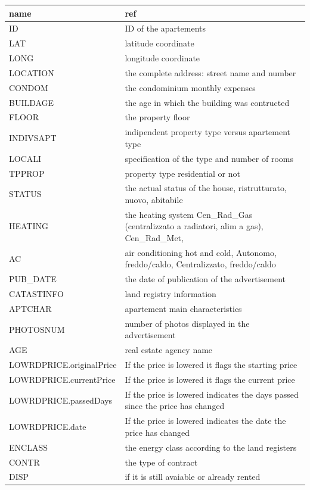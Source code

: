 \documentclass[
  12pt,
  a4paper,
  oneside]{book}
\theoremstyle{definition}
\theoremstyle{definition}
\theoremstyle{definition}
\theoremstyle{remark}
\begin{document}
\begin{longtable}{ll}
\toprule
name & ref\\
\midrule
ID & ID of the apartements\\
LAT & latitude coordinate\\
LONG & longitude coordinate\\
LOCATION & the complete address: street name and number\\
CONDOM & the condominium monthly expenses\\
\addlinespace
BUILDAGE & the age in which the building was contructed\\
FLOOR & the property floor\\
INDIVSAPT & indipendent property type versus apartement type\\
LOCALI & specification of the type and number of rooms\\
TPPROP & property type residential or not\\
\addlinespace
STATUS & the actual status of the house, ristrutturato, nuovo, abitabile\\
HEATING & the heating system Cen\_Rad\_Gas (centralizzato a radiatori, alim a gas), Cen\_Rad\_Met,\\
AC & air conditioning hot and cold, Autonomo, freddo/caldo, Centralizzato, freddo/caldo\\
PUB\_DATE & the date of publication of the advertisement\\
CATASTINFO & land registry information\\
\addlinespace
APTCHAR & apartement main characteristics\\
PHOTOSNUM & number of photos displayed in the advertisement\\
AGE & real estate agency name\\
LOWRDPRICE.originalPrice & If the price is lowered it flags the starting price\\
LOWRDPRICE.currentPrice & If the price is lowered it flags the current price\\
\addlinespace
LOWRDPRICE.passedDays & If the price is lowered indicates the days passed since the price has changed\\
LOWRDPRICE.date & If the price is lowered indicates the date the price has changed\\
ENCLASS & the energy class according to the land registers\\
CONTR & the type of contract\\
DISP & if it is still avaiable or already rented\\

\end{longtable}
\end{document}
